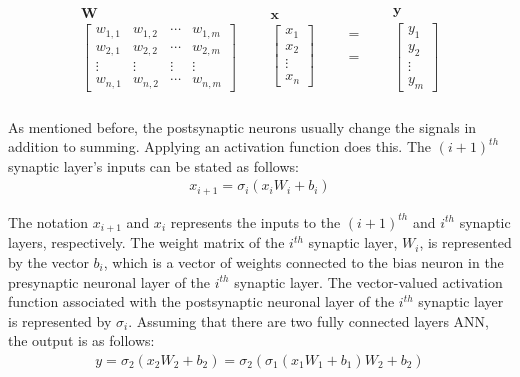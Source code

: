 \begin{align}
\begin{matrix}
& \textbf{W} & \\
& \begin{bmatrix}
    w_{1,1} & w_{1,2} & \cdots & w_{1, m} \\
    w_{2,1} & w_{2,2} & \cdots & w_{2, m} \\
    \vdots & \vdots & \vdots & \vdots \\
    w_{n, 1} & w_{n, 2} & \cdots & w_{n, m}
\end{bmatrix} &\\
\end{matrix}
\begin{matrix}
  & \textbf{x} & \\
 & \begin{bmatrix}
x_{1} \\
x_{2} \\
\vdots \\
x_{n}
\end{bmatrix} &\\
\end{matrix}
\begin{matrix}
 & = & \\
\\
\\
&=&  \\
\\
\end{matrix}
\begin{matrix}
  & \textbf{y} & \\
 & \begin{bmatrix}
y_{1} \\
y_{2} \\
\vdots \\
y_{m}
\end{bmatrix} &\\
\end{matrix}
\label{eq:1.1}
\end{align}

\noindent As mentioned before, the postsynaptic neurons usually change the signals in addition to summing. Applying an activation function does this. The $(i + 1)^{th}$ synaptic layer's inputs can be stated as follows:
\begin{align}
    x_{i+1} = \sigma_i\left( x_i W_i + b_i \right) \label{eq:1.2}
\end{align}

\noindent The notation $x_{i+1}$ and $x_i$ represents the inputs to the $(i + 1)^{th}$ and $i^{th}$ synaptic layers, respectively. The weight matrix of the $i^{th}$ synaptic layer, $W_i$, is represented by the vector $b_i$, which is a vector of weights connected to the bias neuron in the presynaptic neuronal layer of the $i^{th}$ synaptic layer. The vector-valued activation function associated with the postsynaptic neuronal layer of the $i^{th}$ synaptic layer is represented by $\sigma_i$. Assuming that there are two fully connected layers ANN, the output is as follows:
\begin{align}
    y = \sigma_2 (x_2 W_2 + b_2) = \sigma_2 (\sigma_1(x_1 W_1 + b_1) W_2 + b_2) \label{eq:1.3}
\end{align}

